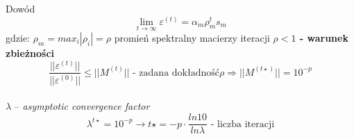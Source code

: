 \begin{frame}{}
  \begin{block}{Dowód}
    \[\lim_{t\to\infty} \varepsilon^{(t)} = \alpha _m \rho _m^t s_m\]
    gdzie: $\rho _m = max_i |\rho _i|= \rho$ promień spektralny macierzy iteracji
    \center \textbf{$\rho < 1$ - warunek zbieżności}
    $$ \frac{||\varepsilon^{(t)}||}{||\varepsilon^{(0)}||} \leq ||M^{(t)}|| \text{ - zadana dokładność} \rho\Rightarrow ||M^{(t\star)}|| = 10^{-p}$$
    \\$\lambda$ -- \emph{asymptotic convergence factor}
    \[\lambda^{t\star}=10^{-p} \rightarrow t\star = -p \cdot  \frac{ln 10}{ln \lambda} \text{ - liczba iteracji}\]
  \end{block}
\end{frame}
